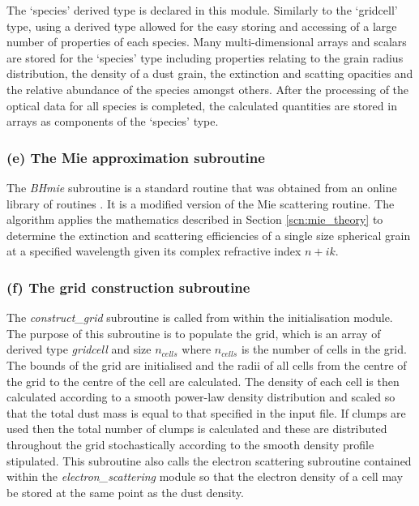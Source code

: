         The `species' derived type is declared in this module.  Similarly to the `gridcell' type, using a derived type allowed for the easy storing and accessing of a large number of properties of each species.  Many multi-dimensional arrays and scalars are stored for the `species' type including properties relating to the grain radius distribution, the density of a dust grain, the extinction and scatting opacities and the relative abundance of the species amongst others.  After the processing of the optical data for all species is completed, the calculated quantities are stored in arrays as components of the `species' type. 
        
        \subsubsection{(e) The Mie approximation subroutine}
		The \textit{BHmie} subroutine is a standard routine that  was obtained from an online library of routines \citep{Press2007}.  It is a modified version of the \citet{Bohren1983} Mie scattering routine.  The algorithm applies the mathematics described in Section \ref{scn:mie_theory} to determine the extinction and scattering efficiencies of a single size spherical grain at a specified wavelength given its complex refractive index $n+ik$.
		
		\subsubsection{(f) The grid construction subroutine}
		The \textit{construct\_grid} subroutine is called from within the initialisation module.  The purpose of this subroutine is to populate the grid, which is an array of derived type \textit{gridcell} and size $n_{cells}$ where $n_{cells}$ is the number of cells in the grid.   The bounds of the grid are initialised and the radii of all cells from the centre of the grid to the centre of the cell are calculated.  The density of each cell is then calculated according to a smooth power-law density distribution and scaled so that the total dust mass is equal to that specified in the input file.  If clumps are used then the total number of clumps is calculated and these are distributed throughout the grid stochastically according to the smooth density profile stipulated.
		This subroutine also calls the electron scattering subroutine contained within the \textit{electron\_scattering} module so that the electron density of a cell may be stored at the same point as the dust density.
		
